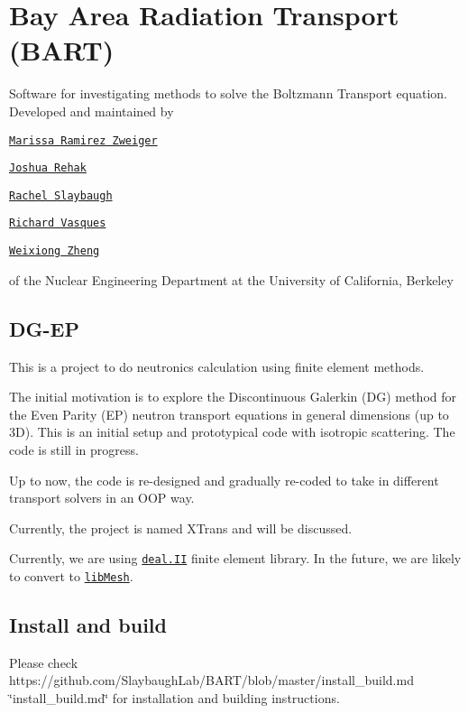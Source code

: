 \href{https://travis-ci.org/SlaybaughLab/BART}{\tt }

\section*{Bay Area Radiation Transport (B\+A\+RT)}

Software for investigating methods to solve the Boltzmann Transport equation. Developed and maintained by


\begin{DoxyItemize}
\item \href{https://github.com/mzweig/}{\tt Marissa Ramirez Zweiger}
\item \href{https://github.com/jsrehak/}{\tt Joshua Rehak}
\item \href{https://github.com/rachelslaybaugh}{\tt Rachel Slaybaugh}
\item \href{https://github.com/ricvasques}{\tt Richard Vasques}
\item \href{https://github.com/weixiong-zheng-berkeley/}{\tt Weixiong Zheng}
\end{DoxyItemize}

of the Nuclear Engineering Department at the University of California, Berkeley

\subsection*{D\+G-\/\+EP}

This is a project to do neutronics calculation using finite element methods.

The initial motivation is to explore the Discontinuous Galerkin (DG) method for the Even Parity (EP) neutron transport equations in general dimensions (up to 3D). This is an initial setup and prototypical code with isotropic scattering. The code is still in progress.

Up to now, the code is re-\/designed and gradually re-\/coded to take in different transport solvers in an O\+OP way.

Currently, the project is named X\+Trans and will be discussed.

Currently, we are using \href{http://www.dealii.org/}{\tt deal.\+II} finite element library. In the future, we are likely to convert to \href{http://libmesh.github.io/}{\tt lib\+Mesh}.

\subsection*{Install and build}

Please check https\+://github.com/\+Slaybaugh\+Lab/\+B\+A\+R\+T/blob/master/install\+\_\+build.\+md \char`\"{}install\+\_\+build.\+md\char`\"{} for installation and building instructions. 